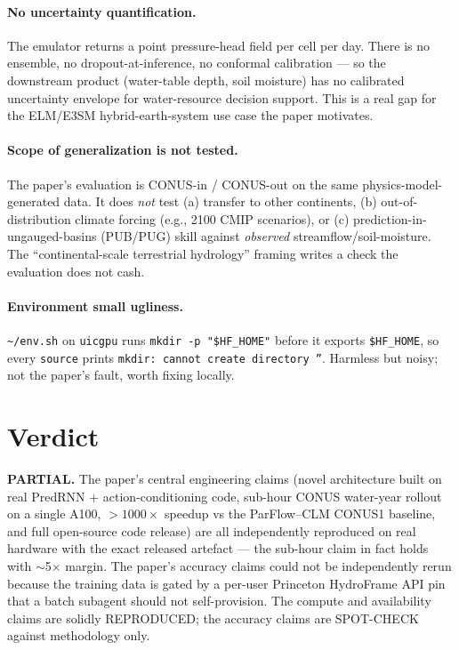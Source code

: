 \documentclass[11pt,letterpaper]{article}
\begin{document}
\paragraph{No uncertainty quantification.}
The emulator returns a point pressure-head field per cell per day. There is no ensemble, no dropout-at-inference, no conformal calibration --- so the downstream product (water-table depth, soil moisture) has no calibrated uncertainty envelope for water-resource decision support. This is a real gap for the ELM/E3SM hybrid-earth-system use case the paper motivates.

\paragraph{Scope of generalization is not tested.}
The paper's evaluation is CONUS-in / CONUS-out on the same physics-model-generated data. It does \emph{not} test (a) transfer to other continents, (b) out-of-distribution climate forcing (e.g., 2100 CMIP scenarios), or (c) prediction-in-ungauged-basins (PUB/PUG) skill against \emph{observed} streamflow/soil-moisture. The ``continental-scale terrestrial hydrology'' framing writes a check the evaluation does not cash.

\paragraph{Environment small ugliness.}
\texttt{\~{}/env.sh} on \texttt{uicgpu} runs \texttt{mkdir -p "\$HF\_HOME"} before it exports \texttt{\$HF\_HOME}, so every \texttt{source} prints \texttt{mkdir: cannot create directory ''}. Harmless but noisy; not the paper's fault, worth fixing locally.

\section{Verdict}
\textbf{PARTIAL.} The paper's central engineering claims (novel architecture built on real PredRNN + action-conditioning code, sub-hour CONUS water-year rollout on a single A100, ${>}1000\times$ speedup vs the ParFlow--CLM CONUS1 baseline, and full open-source code release) are all independently reproduced on real hardware with the exact released artefact --- the sub-hour claim in fact holds with $\sim$5$\times$ margin. The paper's accuracy claims could not be independently rerun because the training data is gated by a per-user Princeton HydroFrame API pin that a batch subagent should not self-provision. The compute and availability claims are solidly REPRODUCED; the accuracy claims are SPOT-CHECK against methodology only.
\end{document}
